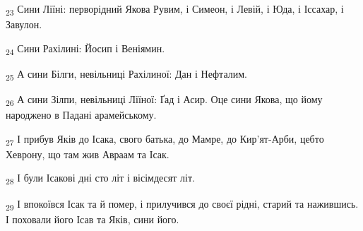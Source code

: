 \begin{tcolorbox}
\textsubscript{23} Сини Ліїні: перворідний Якова Рувим, і Симеон, і Левій, і Юда, і Іссахар, і Завулон.
\end{tcolorbox}
\begin{tcolorbox}
\textsubscript{24} Сини Рахілині: Йосип і Веніямин.
\end{tcolorbox}
\begin{tcolorbox}
\textsubscript{25} А сини Білги, невільниці Рахілиної: Дан і Нефталим.
\end{tcolorbox}
\begin{tcolorbox}
\textsubscript{26} А сини Зілпи, невільниці Ліїної: Ґад і Асир. Оце сини Якова, що йому народжено в Падані арамейському.
\end{tcolorbox}
\begin{tcolorbox}
\textsubscript{27} І прибув Яків до Ісака, свого батька, до Мамре, до Кир'ят-Арби, цебто Хеврону, що там жив Авраам та Ісак.
\end{tcolorbox}
\begin{tcolorbox}
\textsubscript{28} І були Ісакові дні сто літ і вісімдесят літ.
\end{tcolorbox}
\begin{tcolorbox}
\textsubscript{29} І впокоївся Ісак та й помер, і прилучився до своєї рідні, старий та нажившись. І поховали його Ісав та Яків, сини його.
\end{tcolorbox}
